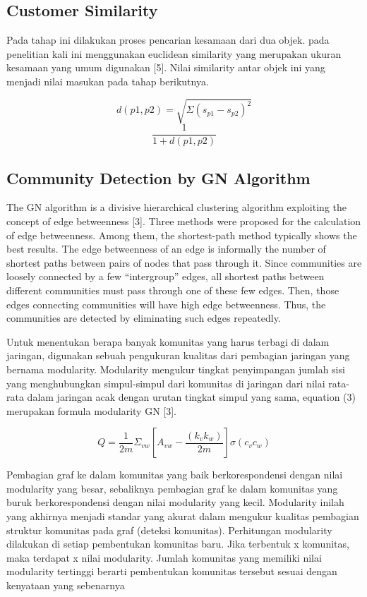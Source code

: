 \documentclass[conference]{IEEEtran}
\begin{document}
\subsection{Customer Similarity}
Pada tahap ini dilakukan proses pencarian kesamaan dari dua objek. pada penelitian kali ini menggunakan euclidean similarity yang merupakan ukuran kesamaan yang umum digunakan [5]. Nilai similarity antar objek ini yang menjadi nilai masukan pada tahap berikutnya.

\begin{equation}
    \label{eq:euclidean_distance}
    d( p1,p2 ) = \sqrt{ \Sigma( s_{p1}-s_{p2})^{2} }
\end{equation}
\begin{equation}
	\label{eq:euclidean_similarity}
    \frac{1}{1 + d(p1,p2)}
\end{equation}

\subsection{Community Detection by GN Algorithm}
The GN algorithm is a divisive hierarchical clustering algorithm exploiting the concept of edge betweenness [3]. Three methods were proposed for the calculation of edge betweenness. Among them, the shortest-path method typically shows the best results. The edge betweenness of an edge is informally the number of shortest paths between pairs of nodes that pass through it. Since communities are loosely connected by a few “intergroup” edges, all shortest paths between different communities must pass through one of these few edges. Then, those edges connecting communities will have high edge betweenness. Thus, the communities are detected by eliminating such edges repeatedly.

Untuk menentukan berapa banyak komunitas yang harus terbagi di dalam jaringan, digunakan sebuah pengukuran kualitas dari pembagian jaringan yang bernama modularity. Modularity mengukur tingkat penyimpangan jumlah sisi yang menghubungkan simpul-simpul dari komunitas di jaringan dari nilai rata-rata dalam jaringan acak dengan urutan tingkat simpul yang sama, equation (3) merupakan formula modularity GN [3].

\begin{equation}
	\label{eq:modularity_GN}
    Q = \frac{1}{2m} \Sigma_{vw} [A_{vw} - \frac{(k_{v}k_{w})}{2m}] \sigma(c_{v}c_{w})
\end{equation}

Pembagian graf ke dalam komunitas yang baik berkorespondensi dengan nilai modularity yang besar, sebaliknya pembagian graf ke dalam komunitas yang buruk berkorespondensi dengan nilai modularity yang kecil. Modularity inilah yang akhirnya menjadi standar yang akurat dalam mengukur kualitas pembagian struktur komunitas pada graf (deteksi komunitas). Perhitungan modularity dilakukan di setiap pembentukan komunitas baru. Jika terbentuk x komunitas, maka terdapat x nilai modularity. Jumlah komunitas yang memiliki nilai modularity tertinggi berarti pembentukan komunitas tersebut sesuai dengan kenyataan yang sebenarnya
\end{document}
